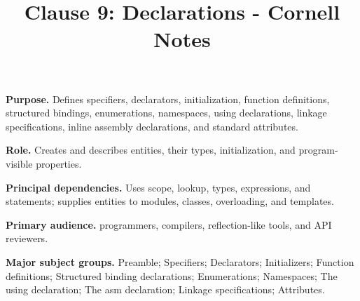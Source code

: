 \documentclass[11pt,letterpaper]{article}
\title{Clause 9: Declarations - Cornell Notes}
\author{}
\date{}
\begin{document}
\maketitle
\begin{CornellReferenceOrientationBox}
\textbf{Purpose.} Defines specifiers, declarators, initialization, function definitions, structured bindings, enumerations, namespaces, using declarations, linkage specifications, inline assembly declarations, and standard attributes.
\par\textbf{Role.} Creates and describes entities, their types, initialization, and program-visible properties.
\par\textbf{Principal dependencies.} Uses scope, lookup, types, expressions, and statements; supplies entities to modules, classes, overloading, and templates.
\par\textbf{Primary audience.} programmers, compilers, reflection-like tools, and API reviewers.
\par\textbf{Major subject groups.} Preamble; Specifiers; Declarators; Initializers; Function definitions; Structured binding declarations; Enumerations; Namespaces; The using declaration; The asm declaration; Linkage specifications; Attributes.
\end{CornellReferenceOrientationBox}
\end{document}
